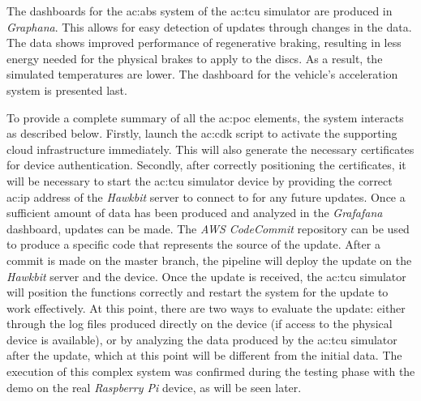 The dashboards for the \gls{ac:abs} system of the \gls{ac:tcu} simulator are produced in \textit{Graphana}. This allows for easy detection of updates through changes in the data. The data shows improved performance of regenerative braking, resulting in less energy needed for the physical brakes to apply to the discs. As a result, the simulated temperatures are lower. The dashboard for the vehicle's acceleration system is presented last.

To provide a complete summary of all the \gls{ac:poc} elements, the system interacts as described below. Firstly, launch the \gls{ac:cdk} script to activate the supporting cloud infrastructure immediately. This will also generate the necessary certificates for device authentication. Secondly, after correctly positioning the certificates, it will be necessary to start the \gls{ac:tcu} simulator device by providing the correct \gls{ac:ip} address of the \textit{Hawkbit} server to connect to for any future updates. Once a sufficient amount of data has been produced and analyzed in the \textit{Grafafana} dashboard, updates can be made. The \textit{AWS CodeCommit} repository can be used to produce a specific code that represents the source of the update. After a commit is made on the master branch, the pipeline will deploy the update on the \textit{Hawkbit} server and the device. Once the update is received, the \gls{ac:tcu} simulator will position the functions correctly and restart the system for the update to work effectively. At this point, there are two ways to evaluate the update: either through the log files produced directly on the device (if access to the physical device is available), or by analyzing the data produced by the \gls{ac:tcu} simulator after the update, which at this point will be different from the initial data. The execution of this complex system was confirmed during the testing phase with the demo on the real \textit{Raspberry Pi} device, as will be seen later.